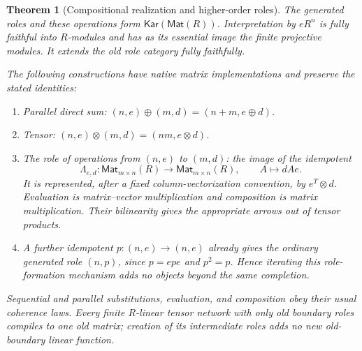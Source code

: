 \documentclass[11pt]{article}
\newtheorem{theorem}{Theorem}[section]
\theoremstyle{definition}
\theoremstyle{remark}
\newcommand{\Mat}{\mathsf{Mat}}
\newcommand{\Kar}{\mathsf{Kar}}
\begin{document}
\begin{theorem}[Compositional realization and higher-order roles]\label{m-thm:reuse}
The generated roles and these operations form $\Kar(\Mat(R))$. Interpretation by $eR^n$ is fully faithful into $R$-modules and has as its essential image the finite projective modules. It extends the old role category fully faithfully.

The following constructions have native matrix implementations and preserve the stated identities:
\begin{enumerate}
\item Parallel direct sum: $(n,e)\oplus(m,d)=(n+m,e\oplus d)$.
\item Tensor: $(n,e)\otimes(m,d)=(nm,e\otimes d)$.
\item The role of operations from $(n,e)$ to $(m,d)$: the image of the idempotent
\[
 \Lambda_{e,d}:\Mat_{m\times n}(R)\to\Mat_{m\times n}(R),\qquad A\mapsto dAe.
\]
It is represented, after a fixed column-vectorization convention, by $e^T\otimes d$. Evaluation is matrix--vector multiplication and composition is matrix multiplication. Their bilinearity gives the appropriate arrows out of tensor products.
\item A further idempotent $p:(n,e)\to(n,e)$ already gives the ordinary generated role $(n,p)$, since $p=epe$ and $p^2=p$. Hence iterating this role-formation mechanism adds no objects beyond the same completion.
\end{enumerate}
Sequential and parallel substitutions, evaluation, and composition obey their usual coherence laws. Every finite $R$-linear tensor network with only old boundary roles compiles to one old matrix; creation of its intermediate roles adds no new old-boundary linear function.
\end{theorem}
\end{document}
